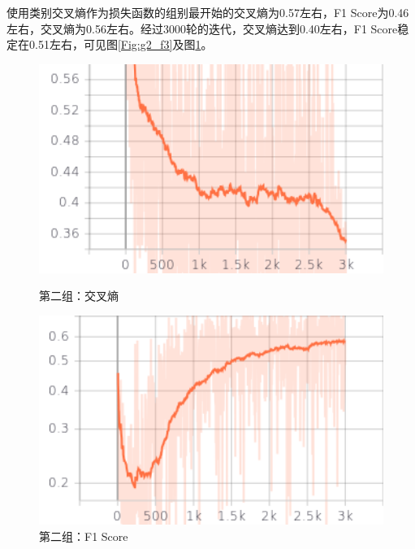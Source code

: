 使用类别交叉熵作为损失函数的组别最开始的交叉熵为0.57左右，F1 Score为0.46左右，交叉熵为0.56左右。经过3000轮的迭代，交叉熵达到0.40左右，F1 Score稳定在0.51左右，可见图\ref{Fig:g2_f3}及图\ref{Fig:g2_f4}。

\begin{figure}[htbp]
    
    \centering
    \begin{minipage}[t]{0.49\textwidth}
        \centering
        \includegraphics[width=1\textwidth]{Figures/图表/类别平衡交叉熵/cross_entropy.png}
        \caption{第二组：交叉熵}
        \label{Fig:g2_f3}
    \end{minipage}
    \begin{minipage}[t]{0.49\textwidth}
        \centering
        \includegraphics[width=1\textwidth]{Figures/图表/类别平衡交叉熵/f1_score.png}
        \caption{第二组：F1 Score}
        \label{Fig:g2_f4}
    \end{minipage}
    
\end{figure}

